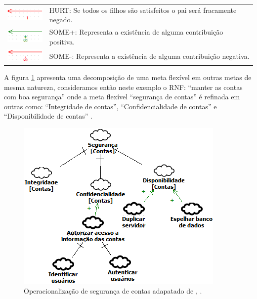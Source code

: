 \begin{table}[h]
\begin{tabular}{|l|l|}
		\multirow{2}{*}{\includegraphics[scale=0.9]{figuras/Hurt.png}} & \multirow{2}{*}{HURT: Se todos os filhos são satisfeitos o pai será fracamente negado.} \\
		&  \\ \hline
		\multirow{2}{*}{\includegraphics[scale=0.9]{figuras/SomeMais.png}} & \multirow{2}{*}{SOME+: Representa a existência de alguma contribuição positiva.} \\
		&  \\ \hline
		\multirow{2}{*}{\includegraphics[scale=0.9]{figuras/SomeMenos.png}} & \multirow{2}{*}{SOME-: Representa a existência de alguma contribuição negativa.} \\
		&  \\ \hline
	\end{tabular}
\end{table}

A figura \ref{exemploNFR} apresenta uma decomposição de uma meta flexível em outras metas de mesma natureza, consideramos então neste exemplo o RNF: “manter as contas com boa segurança” onde a meta flexível  “segurança de contas” é refinada em outras como: “Integridade de contas”, “Confidencialidade de contas” e “Disponibilidade de contas” \cite{chung2012non}.

\begin{figure}[h]
	\centering
	\includegraphics[keepaspectratio=true,scale=1.0]{figuras/exemploNFR.png}
	\caption{Operacionalização de segurança de contas adapatado de \cite{chung2012non}, \cite{affleck2012supporting}.}
	\label{exemploNFR}
\end{figure} 

